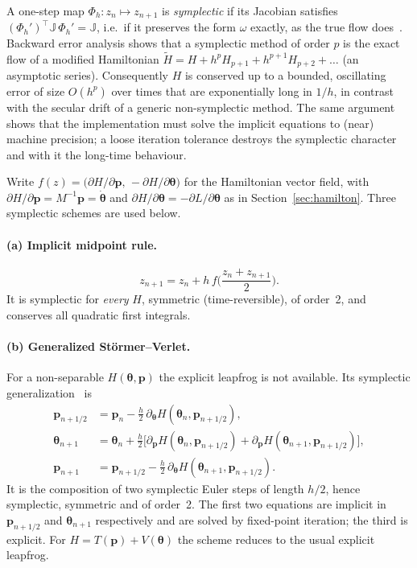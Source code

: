 \documentclass[11pt,a4paper]{book}
\theoremstyle{definition}
\theoremstyle{remark}
\begin{document}
A one-step map $\Phi_h:z_n\mapsto z_{n+1}$ is \emph{symplectic} if its Jacobian satisfies
$(\Phi_h')^{\top}\mathbb J\,\Phi_h'=\mathbb J$, i.e.\ if it preserves the form $\omega$ exactly, as the true flow
does~\cite{ghw,sanzserna,leimkuhler}. Backward error analysis shows that a symplectic method of order $p$ is the exact
flow of a modified Hamiltonian $\tilde H=H+h^pH_{p+1}+h^{p+1}H_{p+2}+\dots$ (an asymptotic series). Consequently $H$ is
conserved up to a bounded, oscillating error of size $O(h^p)$ over times that are exponentially long in $1/h$, in
contrast with the secular drift of a generic non-symplectic method. The same argument shows that the
implementation must solve the implicit equations to (near) machine precision; a loose iteration tolerance destroys
the symplectic character and with it the long-time behaviour.

Write $f(z)=\big(\partial H/\partial\bm p,\,-\partial H/\partial\bm\theta\big)$ for the Hamiltonian vector field, with
$\partial H/\partial\bm p=M^{-1}\bm p=\dot{\bm\theta}$ and $\partial H/\partial\bm\theta=-\partial L/\partial\bm\theta$ as
in Section~\ref{sec:hamilton}. Three symplectic schemes are used below.

\paragraph{(a) Implicit midpoint rule.} 
\begin{equation}
  z_{n+1}=z_n+h\,f\!\Big(\frac{z_n+z_{n+1}}2\Big).
\end{equation}
It is symplectic for \emph{every} $H$, symmetric (time-reversible), of order~2, and conserves all quadratic first
integrals.

\paragraph{(b) Generalized St\"ormer--Verlet.} For a non-separable $H(\bm\theta,\bm p)$ the explicit leapfrog is not
available. Its symplectic generalization~\cite{ghw} is
\begin{align}
  \bm p_{n+1/2}&=\bm p_n-\tfrac h2\,\partial_{\bm\theta}H(\bm\theta_n,\bm p_{n+1/2}),\\
  \bm\theta_{n+1}&=\bm\theta_n+\tfrac h2\big[\partial_{\bm p}H(\bm\theta_n,\bm p_{n+1/2})
                   +\partial_{\bm p}H(\bm\theta_{n+1},\bm p_{n+1/2})\big],\\
  \bm p_{n+1}&=\bm p_{n+1/2}-\tfrac h2\,\partial_{\bm\theta}H(\bm\theta_{n+1},\bm p_{n+1/2}).
\end{align}
It is the composition of two symplectic Euler steps of length $h/2$, hence symplectic, symmetric and of order~2. The
first two equations are implicit in $\bm p_{n+1/2}$ and $\bm\theta_{n+1}$ respectively and are solved by fixed-point
iteration; the third is explicit. For $H=T(\bm p)+V(\bm\theta)$ the scheme reduces to the usual explicit leapfrog.
\end{document}
